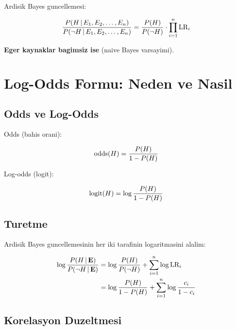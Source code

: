 Ardisik Bayes guncellemesi:

\begin{equation}
\frac{P\!\left(H \,|\, E_1, E_2, \ldots, E_n\right)}{P\!\left(\neg H \,|\, E_1, E_2, \ldots, E_n\right)} = \frac{P\!\left(H\right)}{P\!\left(\neg H\right)} \cdot \prod_{i=1}^{n} \text{LR}_i
\end{equation}

\textbf{Eger kaynaklar bagimsiz ise} (naive Bayes varsayimi).


\section{Log-Odds Formu: Neden ve Nasil}
\label{sec:logodds-derivation}

\subsection{Odds ve Log-Odds}

Odds (bahis orani):

\begin{equation}
\text{odds}(H) = \frac{P\!\left(H\right)}{1 - P\!\left(H\right)}
\end{equation}

Log-odds (logit):

\begin{equation}
\text{logit}(H) = \log\frac{P\!\left(H\right)}{1 - P\!\left(H\right)}
\end{equation}

\subsection{Turetme}

Ardisik Bayes guncellemesinin her iki tarafinin logaritmasini alalim:

\begin{align}
\log\frac{P\!\left(H \,|\, \mathbf{E}\right)}{P\!\left(\neg H \,|\, \mathbf{E}\right)} &= \log\frac{P\!\left(H\right)}{P\!\left(\neg H\right)} + \sum_{i=1}^{n} \log \text{LR}_i \\
&= \log\frac{P\!\left(H\right)}{1 - P\!\left(H\right)} + \sum_{i=1}^{n} \log\frac{c_i}{1 - c_i}
\end{align}

\subsection{Korelasyon Duzeltmesi}

